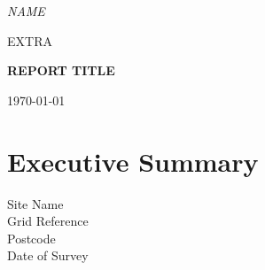 \documentclass[11pt,a4paper]{article}
\begin{document}
\begin{titlepage}
\centering
{\Large\itshape NAME\par}
\vspace{1cm}
{\Large EXTRA\par}
\vspace{1cm}
{\Large\bfseries REPORT TITLE\par}
\vspace{0.5cm}
\vfill
{\large \today\par}
\end{titlepage}


\thispagestyle{plain}
\section*{Executive Summary}

\begin{description}
\item[Site Name]{}
\item[Grid Reference]{}
\item[Postcode]{}
\item[Date of Survey]{}
\end{description}

\vspace{1cm}
\bgroup
\def\arraystretch{1.5}
\begin{tabular}{| m{3cm} | m{11.5cm} |}
\end{tabular}
\egroup

\newpage


\tableofcontents
\listoffigures
\listoftables
\newpage
{}
\onehalfspacing


%


%


\newpage
\begin{appendices}

\end{appendices}
\end{document}
